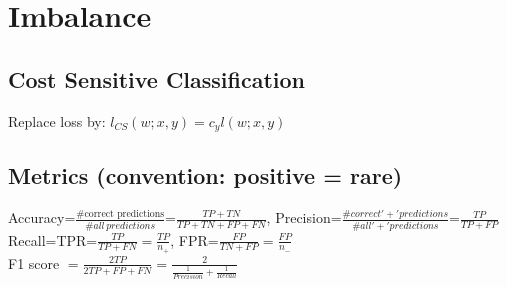\section*{Imbalance}
\subsection*{Cost Sensitive Classification}
Replace loss by: $l_{CS}(w;x,y) = c_y l(w;x,y)$

\subsection*{Metrics (convention: positive = rare)}
Accuracy=$\frac{\text{\#correct predictions}}{\#all\, predictions}$=$\frac{TP+TN}{TP+TN+FP+FN}$, Precision=$\frac{\#correct'+'predictions}{\#all'+'predictions}$=$\frac{TP}{TP+FP}$\\
Recall=TPR=$\frac{TP}{TP+FN}=\frac{TP}{n_+}$, FPR=$\frac{FP}{TN+FP}=\frac{FP}{n_-}$\\
F1 score $=\frac{2TP}{2TP+FP+FN}=\frac{2}{\frac{1}{Precision}+\frac{1}{Recall}}$